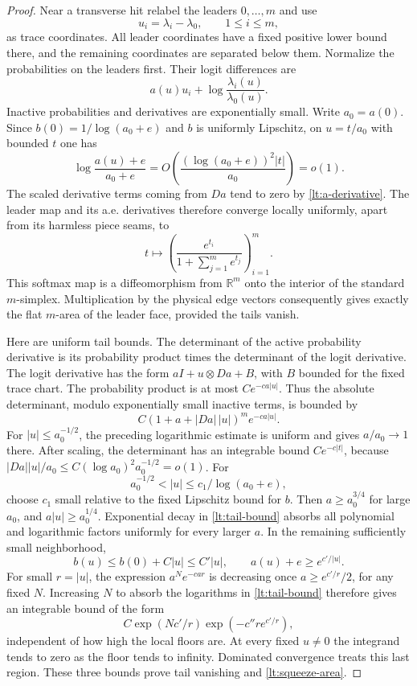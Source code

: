 \documentclass[11pt]{article}
\numberwithin{equation}{section}
\theoremstyle{definition}
\theoremstyle{remark}
\begin{document}
\begin{proof}
Near a transverse hit relabel the leaders $0,\ldots,m$ and use
\[
 u_i=\lambda_i-\lambda_0,\qquad 1\leq i\leq m,
\]
as trace coordinates.  All leader coordinates have a fixed positive
lower bound there, and the remaining coordinates are separated below
them.  Normalize the probabilities on the leaders first.  Their
logit differences are
\[
 a(u)u_i+\log\frac{\lambda_i(u)}{\lambda_0(u)}.
\]
Inactive probabilities and derivatives are exponentially small.
Write $a_0=a(0)$.  Since
$b(0)=1/\log(a_0+e)$ and $b$ is uniformly Lipschitz, on
$u=t/a_0$ with bounded $t$ one has
\[
 \log\frac{a(u)+e}{a_0+e}
       =O\left(\frac{(\log(a_0+e))^2|t|}{a_0}\right)=o(1).
\]
The scaled derivative terms coming from $Da$ tend to zero by
\eqref{lt:a-derivative}.  The leader map and its a.e. derivatives
therefore converge locally uniformly, apart from its harmless
piece seams, to
\[
 t\longmapsto
 \left(\frac{e^{t_i}}{1+\sum_{j=1}^m e^{t_j}}\right)_{i=1}^m.
\]
This softmax map is a diffeomorphism from $\mathbb R^m$ onto the interior
of the standard $m$-simplex.  Multiplication by the physical edge
vectors consequently gives exactly the flat $m$-area of the leader
face, provided the tails vanish.

Here are uniform tail bounds.  The determinant of the active
probability derivative is its probability product times the
determinant of the logit derivative.  The logit derivative has the
form $aI+u\otimes Da+B$, with $B$ bounded for the fixed trace chart.
The probability product is at most $C e^{-ca|u|}$.  Thus the
absolute determinant, modulo exponentially small inactive terms,
is bounded by
\begin{equation}
 C(1+a+|Da|\,|u|)^m e^{-ca|u|}.
 \label{lt:tail-bound}
\end{equation}
For $|u|\leq a_0^{-1/2}$, the preceding logarithmic estimate is
uniform and gives $a/a_0\to1$ there.  After scaling, the
determinant has an integrable bound $Ce^{-c|t|}$, because
$|Da||u|/a_0\leq C(\log a_0)^2a_0^{-1/2}=o(1)$.
For
\[
 a_0^{-1/2}<|u|\leq c_1/\log(a_0+e),
\]
choose $c_1$ small relative to the fixed Lipschitz bound for $b$.
Then $a\geq a_0^{3/4}$ for large $a_0$, and
$a|u|\geq a_0^{1/4}$.  Exponential decay in
\eqref{lt:tail-bound} absorbs all polynomial and logarithmic
factors uniformly for every larger $a$.
In the remaining sufficiently small neighborhood,
\[
 b(u)\leq b(0)+C|u|\leq C'|u|,
 \qquad a(u)+e\geq e^{c'/|u|}.
\]
For small $r=|u|$, the expression $a^N e^{-car}$ is decreasing
once $a\geq e^{c'/r}/2$, for any fixed $N$.  Increasing $N$ to
absorb the logarithms in \eqref{lt:tail-bound} therefore gives an
integrable bound of the form
\[
 C\exp(Nc'/r)\exp(-c''r e^{c'/r}),
\]
independent of how high the local floors are.  At every fixed
$u\ne0$ the integrand tends to zero as the floor tends to infinity.
Dominated convergence treats this last region.  These three bounds
prove tail vanishing and \eqref{lt:squeeze-area}.


\end{proof}
\end{document}
